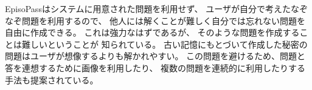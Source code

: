 \documentclass[twoside]{wiss}
\begin{document}
EpisoPassはシステムに用意された問題を利用せず、
ユーザが自分で考えたなぞなぞ問題を利用するので、
他人には解くことが難しく自分では忘れない問題を自由に作成できる。
これは強力なはずであるが、
そのような問題を作成することは難しいということが
知られている\cite{Just:2009:PCC:1572532.1572543}\cite{Schechter:2009:NSM:1607723.1608145}。
%
%
%
古い記憶にもとづいて作成した秘密の問題はユーザが想像するよりも解かれやすい。
この問題を避けるため、問題と答を連想するために画像を利用したり、
複数の問題を連続的に利用したりする手法も提案されている\cite{Renaud:2010:PQE:2146303.2146318}。




\end{document}

